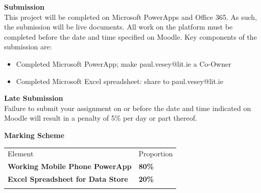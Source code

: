 \newpage


\textbf{Submission}\\
This project will be completed on Microsoft PowerApps and Office 365. As such, the submission will be live documents.  All work on the platform must be completed before the date and time specified on Moodle.  Key components of the submission are:
\begin{itemize}
	\item Completed Microsoft PowerApp; make paul.vesey@lit.ie a Co-Owner
	\item Completed Microsoft Excel spreadsheet: share to paul.vesey@lit.ie
\end{itemize}

\vspace{0.5cm}
\textbf{Late Submission}\\
Failure to submit your assignment on or before the date and time indicated on Moodle will result in a penalty of 5\% per day or part thereof.

\vspace{0.5cm}
\textbf{Marking Scheme}

\begin{table}[h!]
     \begin{center}
     \begin{tabular}{p{8cm}  p{2cm} }
     \toprule
      \textbf\large{Element} & \textbf\large{Proportion} \\ 
    \cmidrule(r){1-1}\cmidrule(lr){2-2}
      \textbf{Working Mobile Phone PowerApp} & \textbf{80\%}\\
      \textbf{Excel Spreadsheet for Data Store} & \textbf{20\%}\\
      \\ \bottomrule
      \end{tabular}
      \label{tbl:markSchemeAsmt3}
      \end{center}
 \end{table}


